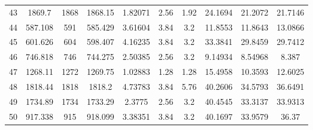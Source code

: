 \begin{table}
\begin{tabular}{cccccccccc}
      43   &  1869.7   &      1868       &  1868.15  & 1.82071  &      2.56      &   1.92   &  24.1694   &     21.2072      &  21.7146   \\
      44   &  587.108  &       591       &  585.429  & 3.61604  &      3.84      &   3.2    &  11.8553   &     11.8643      &  13.0866   \\
      45   &  601.626  &       604       &  598.407  & 4.16235  &      3.84      &   3.2    &  33.3841   &     29.8459      &  29.7412   \\
      46   &  746.818  &       746       &  744.275  & 2.50385  &      2.56      &   3.2    &  9.14934   &     8.54968      &   8.387    \\
      47   &  1268.11  &      1272       &  1269.75  & 1.02883  &      1.28      &   1.28   &  15.4958   &     10.3593      &  12.6025   \\
      48   &  1818.44  &      1818       &  1818.2   & 4.73783  &      3.84      &   5.76   &  40.2606   &     34.5793      &  36.6491   \\
      49   &  1734.89  &      1734       &  1733.29  &  2.3775  &      2.56      &   3.2    &  40.4545   &     33.3137      &  33.9313   \\
      50   &  917.338  &       915       &  918.099  & 3.38351  &      3.84      &   3.2    &  40.1697   &     33.9579      &   36.37    \\
    \hline
    \end{tabular}
    \label{tab:fakeres}
\end{table}